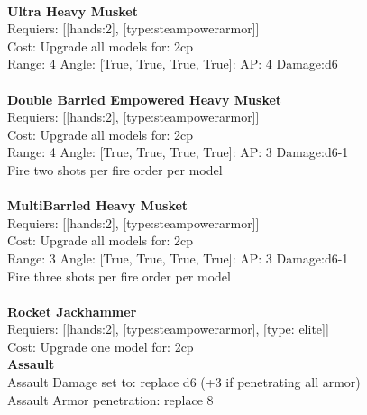 \ \\
{\bf Ultra Heavy Musket } \\

Requiers: [[hands:2], [type:steampowerarmor]] \\
Cost: Upgrade all models for: 2cp \\


Range: 4  Angle: [True, True, True, True]: AP: 4 Damage:d6 \\








\ \\
{\bf Double Barrled Empowered Heavy Musket } \\

Requiers: [[hands:2], [type:steampowerarmor]] \\
Cost: Upgrade all models for: 2cp \\


Range: 4  Angle: [True, True, True, True]: AP: 3 Damage:d6-1 \\
Fire two shots per fire order per model\\ 








\ \\
{\bf MultiBarrled Heavy Musket } \\

Requiers: [[hands:2], [type:steampowerarmor]] \\
Cost: Upgrade all models for: 2cp \\


Range: 3  Angle: [True, True, True, True]: AP: 3 Damage:d6-1 \\
Fire three shots per fire order per model\\ 








\ \\
{\bf Rocket Jackhammer } \\

Requiers: [[hands:2], [type:steampowerarmor], [type: elite]] \\
Cost: Upgrade one model for: 2cp \\




{\bf Assault} \ \\
Assault Damage set to: replace d6 (+3 if penetrating all armor)
\\ 
Assault Armor penetration: replace 8 
\\ 




